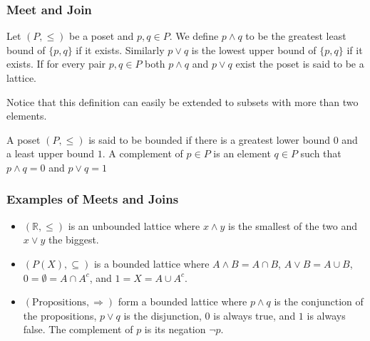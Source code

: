 \documentclass{beamer}
\begin{document}
\begin{frame}

	\frametitle{Meet and Join}
	
	\begin{definition}
	
		Let $(P,\leq)$ be a poset and $p,q\in P$. We define $p\wedge q$ to be the greatest least bound of $\{p,q\}$ if it exists. Similarly $p\vee q$ is the lowest upper bound of $\{p,q\}$ if it exists.	If for every pair $p,q\in P$ both $p\wedge q$ and $p\vee q$ exist the poset is said to be a lattice.
	
	\end{definition}

	Notice that this definition can easily be extended to subsets with more than two elements.

	\begin{definition}
		
		A poset $(P,\leq)$ is said to be bounded if there is a greatest lower bound $0$ and a least upper bound $1$. A complement of $p\in P$ is an element $q\in P$ such that $p\wedge q=0$ and $p\vee q=1$		
		
	\end{definition}

\end{frame}

\begin{frame}

	\frametitle{Examples of Meets and Joins}
	
	\begin{example}
	
		\begin{itemize}
		
			\item $(\mathbb{R},\leq)$ is an unbounded lattice where $x\wedge y$ is the smallest of the two and $x\vee y$ the biggest.
		
			\item $(P(X),\subseteq)$ is a bounded lattice where $A\wedge B=A\cap B$, $A\vee B=A\cup B$, $0=\emptyset=A\cap A^c$, and $1=X=A\cup A^c$.
			
			\item $(\text{Propositions},\Rightarrow)$ form a bounded lattice where $p\wedge q$ is the conjunction of the propositions, $p\vee q$ is the disjunction, $0$ is always true, and $1$ is always false. The complement of $p$ is its negation $\neg p$.
		
		\end{itemize}			
	
	\end{example}

\end{frame}
\end{document}
